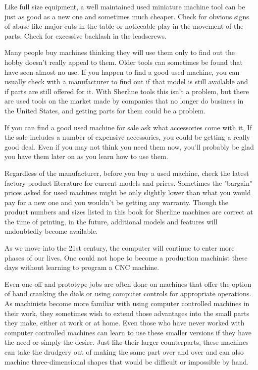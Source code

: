
Like full size equipment, a well maintained used miniature machine tool can be
just as good as a new one and sometimes much cheaper. Check for obvious signs of
abuse like major cuts in the table or noticeable play in the movement of the
parts. Check for excessive backlash in the leadscrews.

Many people buy machines thinking they will use them only to find out the hobby
doesn't really appeal to them. Older tools can sometimes be found that have seen
almost no use. If you happen to find a good used machine, you can usually check
with a manufacturer to find out if that model is still available and if parts
are still offered for it. With Sherline tools this isn't a problem, but there
are used tools on the market made by companies that no longer do business in the
United States, and getting parts for them could be a problem.


If you can find a good used machine for sale ask what accessories come with it,
If the sale includes a number of expensive accessories, you could be getting a
really good deal. Even if you may not think you need them now, you'll probably
be glad you have them later on as you learn how to use them.


Regardless of the manufacturer, before you buy a used machine, check the latest
factory product literature for current models and prices. Sometimes the
"bargain" prices asked for used machines might be only slightly lower than what
you would pay for a new one and you wouldn't be getting any warranty. Though the
product numbers and sizes listed in this book for Sherline machines are correct
at the time of printing, in the future, additional models and features will
undoubtedly become available.


As we move into the 21st century, the computer will continue to enter more
phases of our lives. One could not hope to become a production machinist these
days without learning to program a CNC machine.

Even one-off and prototype jobs are often done on machines that offer the option
of hand cranking the dials or using computer controls for appropriate
operations. As machinists become more familiar with using computer controlled
machines in their work, they sometimes wish to extend those advantages into the
small parts they make, either at work or at home. Even those who have never
worked with computer controlled machines can learn to use these smaller versions
if they have the need or simply the desire. Just like their larger counterparts,
these machines can take the drudgery out of making the same part over and over
and can also machine three-dimensional shapes that would be difficult or
impossible by hand.

